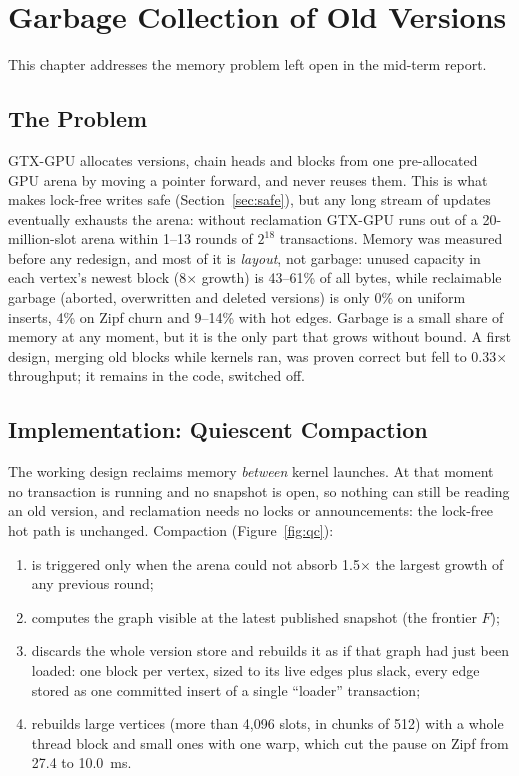\documentclass[11pt,a4paper,oneside]{report}
\newcommand{\sys}{GTX-GPU}
\begin{document}
\chapter{Garbage Collection of Old Versions}
\label{ch:gc}
This chapter addresses the memory problem left open in the mid-term report.

\section{The Problem}
\sys{} allocates versions, chain heads and blocks from one pre-allocated GPU arena by moving a pointer forward, and
never reuses them. This is what makes lock-free writes safe (Section~\ref{sec:safe}), but any long stream of updates
eventually exhausts the arena: without reclamation \sys{} runs out of a 20-million-slot arena within 1--13 rounds of
$2^{18}$ transactions. Memory was measured before any redesign, and most of it is \emph{layout}, not garbage: unused
capacity in each vertex's newest block (8$\times$ growth) is 43--61\% of all bytes, while reclaimable garbage (aborted,
overwritten and deleted versions) is only 0\% on uniform inserts, 4\% on Zipf churn and 9--14\% with hot edges.
Garbage is a small share of memory at any moment, but it is the only part that grows without bound. A first design,
merging old blocks while kernels ran, was proven correct but fell to 0.33$\times$ throughput; it remains in the code,
switched off.

\section{Implementation: Quiescent Compaction}
\label{sec:qc}
The working design reclaims memory \emph{between} kernel launches. At that moment no transaction is running and no
snapshot is open, so nothing can still be reading an old version, and reclamation needs no locks or announcements:
the lock-free hot path is unchanged. Compaction (Figure~\ref{fig:qc}):
\begin{enumerate}
\item is triggered only when the arena could not absorb 1.5$\times$ the largest growth of any previous round;
\item computes the graph visible at the latest published snapshot (the frontier $F$);
\item discards the whole version store and rebuilds it as if that graph had just been loaded: one block per vertex,
  sized to its live edges plus slack, every edge stored as one committed insert of a single ``loader'' transaction;
\item rebuilds large vertices (more than 4,096 slots, in chunks of 512) with a whole thread block and small ones with
  one warp, which cut the pause on Zipf from 27.4 to 10.0~ms.
\end{enumerate}
\end{document}

